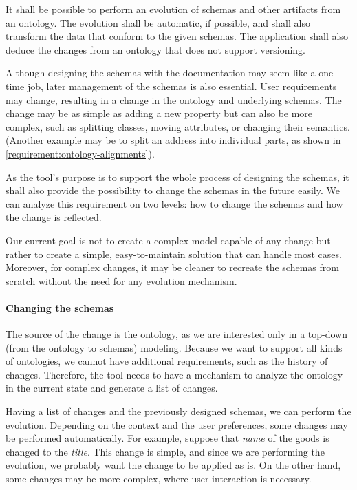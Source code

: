 \begin{requirement}
    It shall be possible to perform an evolution of schemas and other artifacts from an ontology. The evolution shall be automatic, if possible, and shall also transform the data that conform to the given schemas. The application shall also deduce the changes from an ontology that does not support versioning.
    \label{requirement:evolution}
\end{requirement}

Although designing the schemas with the documentation may seem like a one-time job, later management of the schemas is also essential. User requirements may change, resulting in a change in the ontology and underlying schemas. The change may be as simple as adding a new property but can also be more complex, such as splitting classes, moving attributes, or changing their semantics. (Another example may be to split an address into individual parts, as shown in \autoref{requirement:ontology-alignments}).

As the tool's purpose is to support the whole process of designing the schemas, it shall also provide the possibility to change the schemas in the future easily. We can analyze this requirement on two levels: how to change the schemas and how the change is reflected.

Our current goal is not to create a complex model capable of any change but rather to create a simple, easy-to-maintain solution that can handle most cases. Moreover, for complex changes, it may be cleaner to recreate the schemas from scratch without the need for any evolution mechanism.

\paragraph{Changing the schemas} The source of the change is the ontology, as we are interested only in a top-down (from the ontology to schemas) modeling. Because we want to support all kinds of ontologies, we cannot have additional requirements, such as the history of changes. Therefore, the tool needs to have a mechanism to analyze the ontology in the current state and generate a list of changes.

Having a list of changes and the previously designed schemas, we can perform the evolution. Depending on the context and the user preferences, some changes may be performed automatically. For example, suppose that \textit{name} of the goods is changed to the \textit{title}. This change is simple, and since we are performing the evolution, we probably want the change to be applied as is. On the other hand, some changes may be more complex, where user interaction is necessary.

